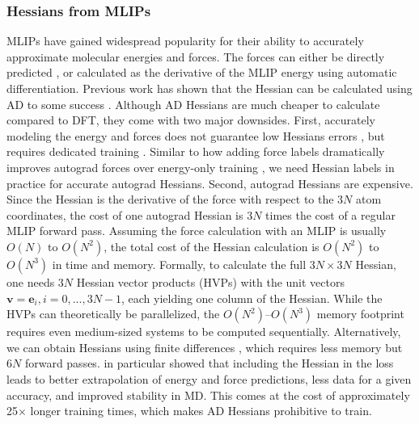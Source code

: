 \documentclass[pdflatex,sn-mathphys-num]{sn-jnl}%
\theoremstyle{thmstyleone}%
\theoremstyle{thmstyletwo}%
\theoremstyle{thmstylethree}%
\begin{document}
\begin{appendices}
\subsubsection{Hessians from MLIPs}
MLIPs have gained widespread popularity for their ability to accurately approximate molecular energies and forces. The forces can either be directly predicted \citep{gasteiger2021, liao2023equiformerv2}, or calculated as the derivative of the MLIP energy using automatic differentiation. %
Previous work has shown that the Hessian can be calculated using AD to some success \citep{yang2024, yuan2024, gonnheimer2025, rodriguez2025, williams2025, cui2025horm}. 
Although AD Hessians are much cheaper to calculate compared to DFT, they come with two major downsides.
First, accurately modeling the energy and forces does not guarantee low Hessians errors \citep{yuan2024}, but requires dedicated training \citep{zhao2025, cui2025horm}. 
Similar to how adding force labels dramatically improves autograd forces over energy-only training \cite{christensen2020forces}, we need Hessian labels in practice for accurate autograd Hessians.
Second, autograd Hessians are expensive.
Since the Hessian is the derivative of the force with respect to the $3N$ atom coordinates, the cost of one autograd Hessian is $3N$ times the cost of a regular MLIP forward pass.
Assuming the force calculation with an MLIP is usually $O(N)$ to $O(N^2)$, the total cost of the Hessian calculation is $O(N^2)$ to $O(N^3)$ in time and memory. 
Formally, to calculate the full $3N\times 3N$ Hessian, one needs $3N$ Hessian vector products (HVPs) with the unit vectors $\mathbf{v} = \mathbf{e}_i, i=0,...,3N-1$, each yielding one column of the Hessian. 
While the HVPs can theoretically be parallelized, the $O(N^2)$--$O(N^3)$ memory footprint requires even medium-sized systems to be computed sequentially.
Alternatively, we can obtain Hessians using finite differences \citep{gonnheimer2025, fu2025, wander2025accessing}, which requires less memory but $6N$ forward passes.
\cite{rodriguez2025} in particular showed that including the Hessian in the loss leads to better extrapolation of energy and force predictions, less data for a given accuracy, and improved stability in MD. This comes at the cost of approximately 25$\times$ longer training times, which makes AD Hessians prohibitive to train.


\end{appendices}
\end{document}
